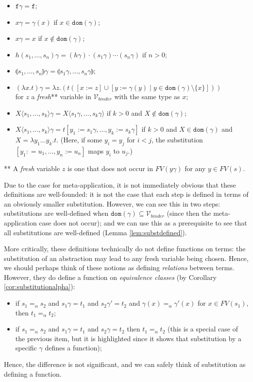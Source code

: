\documentclass{lmcs}
\theoremstyle{theorem}\newtheorem{theorem}{Theorem}
\theoremstyle{theorem}\newtheorem{lemma}[theorem]{Lemma}
\theoremstyle{theorem}\newtheorem{corollary}[theorem]{Corollary}
\theoremstyle{definition}\newtheorem{definition}[theorem]{Definition}
\theoremstyle{definition}\newtheorem{example}[theorem]{Example}
\newcommand{\Vbound}{\mathcal{V}_{\mathit{binder}}}
\newcommand{\FV}{\mathit{FV}}
\newcommand{\domain}{\mathtt{dom}}
\newcommand{\identifier}[1]{\mathtt{#1}}
\newcommand{\afun}{\identifier{f}}
\newcommand{\avar}{x}
\newcommand{\bvar}{y}
\newcommand{\cvar}{z}
\newcommand{\Avar}{X}
\newcommand{\abs}[2]{\lambda #1.#2}
\newcommand{\meta}[2]{#1\langle#2\rangle}
\newcommand{\tuple}[2]{\llparenthesis #1,\dots,#2 \rrparenthesis}
\begin{document}
\begin{itemize}
\item $\afun\gamma = \afun$;
\item $\avar\gamma = \gamma(\avar)$ if $\avar \in \domain(\gamma)$;
\item $\avar\gamma = \avar$ if $\avar \notin \domain(\gamma)$;
\item $h(s_1,\dots,s_n)\gamma = (h\gamma) \cdot (s_1\gamma) \cdots (s_n\gamma)$
  if $n > 0$;
\item $\tuple{s_1}{s_n}\gamma = \tuple{s_1\gamma}{s_n\gamma}$;
\item $(\abs{\avar}{t})\gamma = \abs{\cvar}{(t ([\avar:=\cvar] \cup [\bvar:=
  \gamma(\bvar) \mid \bvar \in \domain(\gamma) \setminus \{\avar\}]))}$ \\
  for $\cvar$ a \emph{fresh}** variable in $\Vbound$ with the same type as
  $\avar$;
\item $\meta{\Avar}{s_1,\dots,s_k}\gamma = \meta{\Avar}{s_1\gamma,\dots,s_k
  \gamma}$ if $k > 0$ and $\Avar \notin \domain(\gamma)$;
\item $\meta{\Avar}{s_1,\dots,s_k}\gamma = t[\bvar_1:=s_1\gamma,\dots,\bvar_k:=
  s_k\gamma]$ if $k > 0$ and $\Avar \in \domain(\gamma)$ and $\Avar =
  \abs{\bvar_1 \dots \bvar_k}{t}$.
  (Here, if some $\bvar_i = \bvar_j$ for $i < j$, the substitution $[\bvar_1:
  =u_1,\dots,\bvar_n:=u_n]$ maps $\bvar_i$ to $u_j$.)
\end{itemize}
** A \emph{fresh} variable $\cvar$ is one that does not occur in
$\FV(\bvar\gamma)$ for any $\bvar \in \FV(s)$.

Due to the case for meta-application, it is not immediately obvious that these
definitions are well-founded: it is not the case that each step is defined in
terms of an obviously smaller substitution.  However, we can see this in two
steps: substitutions are well-defined when $\domain(\gamma) \subseteq \Vbound$
(since then the meta-application case does not occur); and we can use this as a
prerequisite to see that all substitutions are well-defined (Lemma
\ref{lem:substdefined}).

More critically, these definitions technically do not define functions on terms:
the substitution of an abstraction may lead to any fresh variable being chosen.
Hence, we should perhaps think of these notions as defining \emph{relations}
between terms.  However, they do define a function on \emph{equivalence classes}
(by Corollary \ref{cor:substitutionalpha}):
\begin{itemize}
\item if $s_1 =_\alpha s_2$ and $s_1\gamma = t_1$ and $s_2\gamma' = t_2$ and
  $\gamma(x) =_\alpha \gamma'(x)$ for $x \in \FV(s_1)$, then $t_1 =_\alpha t_2$;
\item if $s_1 =_\alpha s_2$ and $s_1\gamma = t_1$ and $s_2\gamma = t_2$ then
  $t_1 =_\alpha t_2$ (this is a special case of the previous item, but it is
  highlighted since it shows that substitution by a specific $\gamma$ defines a
  function);
\end{itemize}
Hence, the difference is not significant, and we can safely think of
substitution as defining a function.
\end{document}
